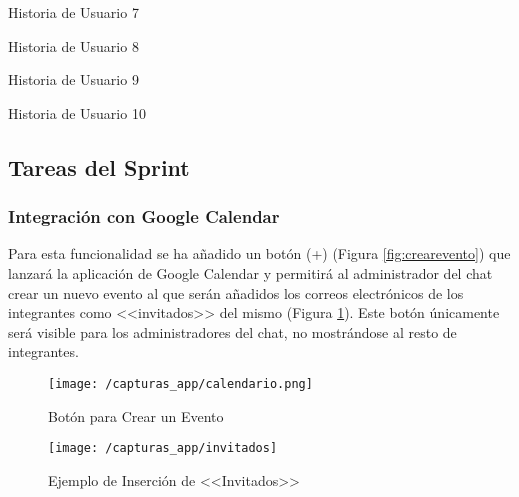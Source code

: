 \begin{table}[hp]
	\centering
	{\small
		
	}
	\caption[Historia de Usuario 7]
	{Historia de Usuario 7}
	\label{tab:historia7}
\end{table}

\begin{table}[hp]
	\centering
	{\small
		
	}
	\caption[Historia de Usuario 8]
	{Historia de Usuario 8}
	\label{tab:historia8}
\end{table}

\clearpage

\begin{table}[hp]
	\centering
	{\small
		
	}
	\caption[Historia de Usuario 9]
	{Historia de Usuario 9}
	\label{tab:historia9}
\end{table}

\begin{table}[!htbp]
	\centering
	{\small
		
	}
	\caption[Historia de Usuario 10]
	{Historia de Usuario 10}
	\label{tab:historia10}
\end{table}

\subsection{Tareas del Sprint}
\subsubsection{Integración con Google Calendar}
Para esta funcionalidad se ha añadido un botón (+) (Figura \ref{fig:crearevento}) que lanzará la aplicación de Google Calendar y permitirá al administrador del chat crear un nuevo evento al que serán añadidos los correos electrónicos de los integrantes como <<invitados>> del mismo (Figura \ref{fig:invitados}). Este botón únicamente será visible para los administradores del chat, no mostrándose al resto de integrantes.

\begin{figure}[!h]
	\centering
	\begin{minipage}{.5\textwidth}
		\centering
		\texttt{[image: /capturas\_app/calendario.png]}
		\caption{Botón para Crear un Evento}
		\label{fig:crearevento}
	\end{minipage}%
	\begin{minipage}{.5\textwidth}
		\centering
		\texttt{[image: /capturas\_app/invitados]}
		\caption{Ejemplo de Inserción de <<Invitados>>}
		\label{fig:invitados}
	\end{minipage}
\end{figure}

